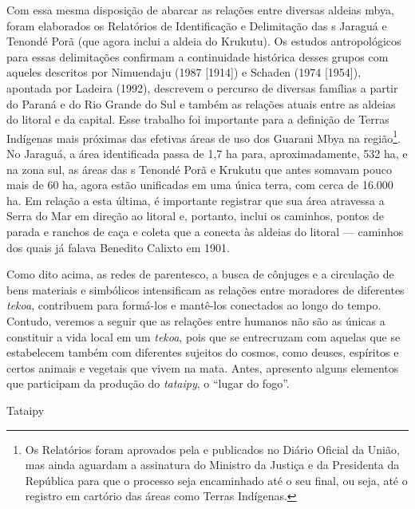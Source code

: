 Com essa mesma disposição de abarcar as relações entre diversas aldeias
mbya, foram elaborados os Relatórios de Identificação e Delimitação das
s Jaraguá e Tenondé Porã (que agora inclui a aldeia do Krukutu). Os
estudos antropológicos para essas delimitações confirmam a continuidade
histórica desses grupos com aqueles descritos por Nimuendaju (1987
[1914]) e Schaden (1974 [1954]), apontada por Ladeira (1992), descrevem
o percurso de diversas famílias a partir do Paraná e do Rio Grande do
Sul e também as relações atuais entre as aldeias do litoral e da
capital. Esse trabalho foi importante para a definição de Terras
Indígenas mais próximas das efetivas áreas de uso dos Guarani Mbya na
região\footnote{Os Relatórios foram aprovados pela  e publicados
no Diário Oficial da União, mas ainda aguardam a assinatura do Ministro
da Justiça e da Presidenta da República para que o processo seja
encaminhado até o seu final, ou seja, até o registro em cartório das
áreas como Terras Indígenas.}. No Jaraguá, a área identificada passa de
1,7 ha para, aproximadamente, 532 ha, e na zona sul, as áreas das s
Tenondé Porã e Krukutu que antes somavam pouco mais de 60 ha, agora
estão unificadas em uma única terra, com cerca de 16.000 ha. Em relação
a esta última, é importante registrar que sua área atravessa a Serra do
Mar em direção ao litoral e, portanto, inclui os caminhos, pontos de
parada e ranchos de caça e coleta que a conecta às aldeias do litoral ---
caminhos dos quais já falava Benedito Calixto em 1901.

Como dito acima, as redes de parentesco, a busca de cônjuges e a
circulação de bens materiais e simbólicos intensificam as relações
entre moradores de diferentes \emph{tekoa}, contribuem para formá-los e
mantê-los conectados ao longo do tempo. Contudo, veremos a seguir que
as relações entre humanos não são as únicas a constituir a vida local
em um \emph{tekoa}, pois que se entrecruzam com aquelas que se estabelecem
também com diferentes sujeitos do cosmos, como deuses, espíritos e
certos animais e vegetais que vivem na mata. Antes, apresento alguns
elementos que participam da produção do \emph{tataipy}, o ``lugar do fogo''.

Tataipy


